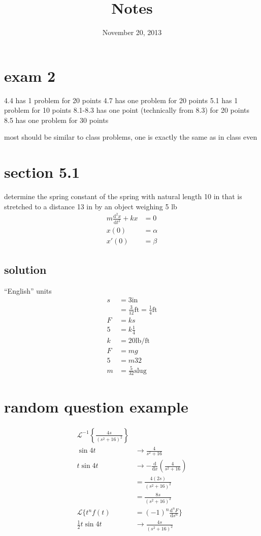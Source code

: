 \documentclass{article}
\begin{document}
\title{Notes}
\date{November 20, 2013}
\maketitle
\section*{exam 2}
4.4 has 1 problem for 20 points
4.7 has one problem for 20 points
5.1 has 1 problem for 10 points
8.1-8.3 has one point (technically from 8.3) for 20 points
8.5 has one problem for 30 points

most should be similar to class problems, one is exactly the same as in class even

\section*{section 5.1}
determine the spring constant of the spring with natural length 10 in that is stretched to a distance 13 in by an object weighing 5 lb
\begin{align*}
    m\frac{\mathrm{d}^2x}{\mathrm{d}t^2}+kx&=0\\
    x(0)&=\alpha\\
    x'(0)&=\beta
\end{align*}
\subsection*{solution}
``English'' units
\begin{align*}
    s&=3\text{in}\\
    &=\frac{3}{12}\text{ft}=\frac{1}{4}\text{ft}\\
    F&=ks\\
    5&=k\frac{1}{4}\\
    k&=20\text{lb/ft}\\
    F&=mg\\
    5&=m32\\
    m&=\frac{5}{32}\text{slug}
\end{align*}
\section*{random question example}
\begin{align*}
    \mathcal{L}^{-1}\left\{\frac{4s}{(s^2+16)^2}\right\}\\
    \sin 4t &\to \frac{4}{s^2+16}\\
    t\sin 4t &\to -\frac{\mathrm{d}}{\mathrm{d}x}(\frac{4}{s^2+16})\\
    &=\frac{4(2s)}{(s^2+16)^2}\\
    &=\frac{8s}{(s^2+16)^2}\\
    \mathcal{L}\{t^nf(t)&=(-1)^n\frac{\mathrm{d}^nF}{\mathrm{d}s^n}\}\\
    \frac{1}{2}t\sin 4t&\to \frac{4s}{(s^2+16)^2}
\end{align*}
\end{document}
